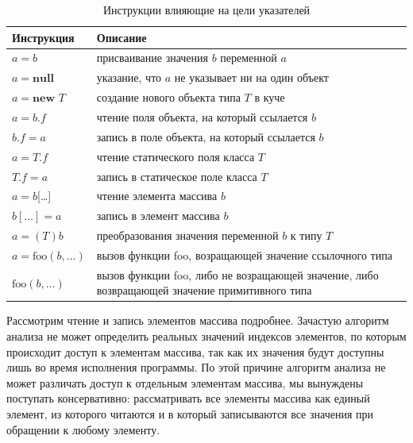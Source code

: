 \documentclass[14pt,titlepage]{extarticle}
\newcommand{\NEW}{\textbf{new }}
\newcommand{\NULL}{\textbf{null }}
\begin{document}
      \begin{table}
        \begin{tabular}{|l|p{120mm}|}\hline
          \textbf{Инструкция} & \textbf{Описание}\\ \hline

          $a = b$
          & присваивание значения $b$ переменной $a$ \\ \hline

          $a = \NULL$
          & указание, что $a$ не указывает ни на один объект \\ \hline

          $a = \NEW T$
          & создание нового объекта типа $T$ в куче \\ \hline

          $a = b.f$
          & чтение поля объекта, на который ссылается $b$ \\ \hline

          $b.f = a$
          & запись в поле объекта, на который ссылается $b$ \\ \hline

          $a = T.f$
          & чтение статического поля класса $T$ \\ \hline

          $T.f = a$
          & запись в статическое поле класса $T$ \\ \hline

          $a = b$[\ldots]
          & чтение элемента массива $b$ \\ \hline

          $b[\ldots] = a$
          & запись в элемент массива $b$ \\ \hline

          $a = (T)b$
          & преобразования значения переменной $b$ к типу $T$ \\ \hline

          $a = \textrm{foo}(b, \ldots)$
          & вызов функции foo, возращающей значение ссылочного типа \\ \hline

          $\textrm{foo}(b, \ldots)$
          & вызов функции foo, либо не возращающей значение, либо возвращающей значение примитивного типа \\ \hline
        \end{tabular}
        \caption{Инструкции влияющие на цели указателей}
        \label{tabular:instructions}
      \end{table}

      Рассмотрим чтение и запись элементов массива подробнее. Зачастую
      алгоритм анализа не может определить реальных значений индексов
      элементов, по которым происходит доступ к элементам массива, так как их
      значения будут доступны лишь во время исполнения программы. По этой
      причине алгоритм анализа не может различать доступ к отдельным элементам
      массива, мы вынуждены поступать консервативно: рассматривать все элементы
      массива как единый элемент, из которого читаются и в который записываются
      все значения при обращении к любому элементу.
\end{document}
